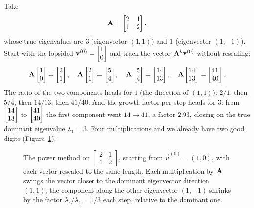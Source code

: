 \begin{example}
\label{ch33:power}
Take
\[
  \mathbf{A} = \begin{bmatrix} 2 & 1 \\ 1 & 2 \end{bmatrix},
\]
whose true eigenvalues are $3$ (eigenvector $(1,1)$) and $1$ (eigenvector $(1,-1)$).
Start with the lopsided $\mathbf{v}^{(0)}=\begin{bmatrix}1\\0\end{bmatrix}$ and track the vector
$\mathbf{A}^k\mathbf{v}^{(0)}$ without rescaling:
\[
  \mathbf{A}\begin{bmatrix}1\\0\end{bmatrix}=\begin{bmatrix}2\\1\end{bmatrix},\quad
  \mathbf{A}\begin{bmatrix}2\\1\end{bmatrix}=\begin{bmatrix}5\\4\end{bmatrix},\quad
  \mathbf{A}\begin{bmatrix}5\\4\end{bmatrix}=\begin{bmatrix}14\\13\end{bmatrix},\quad
  \mathbf{A}\begin{bmatrix}14\\13\end{bmatrix}=\begin{bmatrix}41\\40\end{bmatrix}.
\]
The ratio of the two components heads for $1$ (the direction of $(1,1)$):
$2/1$, then $5/4$, then $14/13$, then $41/40$. And the growth factor per step heads
for $3$: from $\begin{bmatrix}14\\13\end{bmatrix}$ to $\begin{bmatrix}41\\40\end{bmatrix}$ the first component went
$14\to 41$, a factor $2.93$, closing on the true dominant eigenvalue $\lambda_1=3$.
Four multiplications and we already have two good digits
(Figure~\ref{ch33:powerfig}).
\end{example}

\begin{figure}[H]
\centering
{}
\caption{The power method on $\left[\begin{smallmatrix}2&1\\1&2\end{smallmatrix}\right]$,
starting from $\vec{v}^{(0)}=(1,0)$, with each vector rescaled to the same length. Each
multiplication by $\mathbf{A}$ swings the vector closer to the dominant eigenvector
direction $(1,1)$; the component along the other eigenvector $(1,-1)$ shrinks by the
factor $\lambda_2/\lambda_1 = 1/3$ each step, relative to the dominant one.}
\label{ch33:powerfig}
\end{figure}

